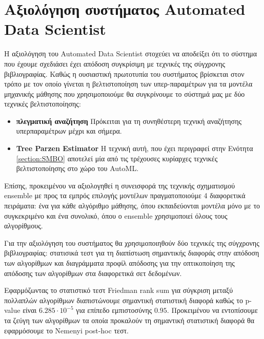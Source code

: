 \section{Αξιολόγηση συστήματος Automated Data Scientist}\label{section:eval_system}
Η αξιολόγηση του Automated Data Scientist στοχεύει να αποδείξει ότι το σύστημα που έχουμε σχεδιάσει έχει απόδοση συγκρίσιμη με τεχνικές της σύγχρονης βιβλιογραφίας. Καθώς η ουσιαστική πρωτοτυπία του συστήματος βρίσκεται στον τρόπο με τον οποίο γίνεται η βελτιστοποίηση των υπερ-παρα\-μέ\-τρων για τα μοντέλα μηχανικής μάθησης που χρησιμοποιούμε θα συγκρίνουμε το σύστημά μας με δύο τεχνικές βελτιστοποίησης:
\begin{itemize}
	\item \textbf{πλεγματική αναζήτηση} Πρόκειται για τη συνηθέστερη τεχνική αναζήτησης υπερπαρα\-μέτρων μέχρι και σήμερα.
	\item \textbf{Tree Parzen Estimator} Η τεχνική αυτή, που έχει περιγραφεί στην Ενότητα \ref{section:SMBO} αποτελεί μία από τις τρέχουσες κυρίαρχες τεχνικές βελτιστοποίησης στο χώρο του AutoML.
\end{itemize}

Eπίσης, προκειμένου να αξιολογηθεί η συνεισφορά της τεχνικής σχηματισμού ensemble  με προς τα εμπρός επιλογής μοντέλων πραγματοποιούμε 4 διαφορετικά πειράματα: ένα για κάθε αλγόριθμο μάθησης, όπου εκπαιδεύονται μοντέλα μόνο με το συγκεκριμένο και ένα συνολικό, όπου ο ensemble χρησιμοποιεί όλους τους αλγορίθμους. 

Για την αξιολόγηση του συστήματος θα χρησιμοποιηθούν δύο τεχνικές της σύγχρονης βιβλιογραφίας: στατισικά τεστ για τη διαπίστωση σημαντικής διαφοράς στην απόδοση των αλγορίθμων και διαγράμματα προφίλ απόδοσης για την οπτικοποίηση της απόδοσης των αλγορίθμων στα διαφορετικά σετ δεδομένων. 

Εφαρμόζωντας το στατιστικό τεστ Friedman rank sum για σύγκριση μεταξύ πολλαπλών αλγορίθμων διαπιστώνουμε σημαντική στατιστική διαφορά καθώς το p-value είναι $6.285 \cdot 10^{-5}$ για επίπεδο εμπιστοσύνης $0.95$. Προκειμένου να εντοπίσουμε τα ζεύγη των αλγορίθμων τα οποία προκαλούν τη σημαντική στατιστική διαφορά θα εφαρμόσουμε το Nemenyi post-hoc τεστ.

